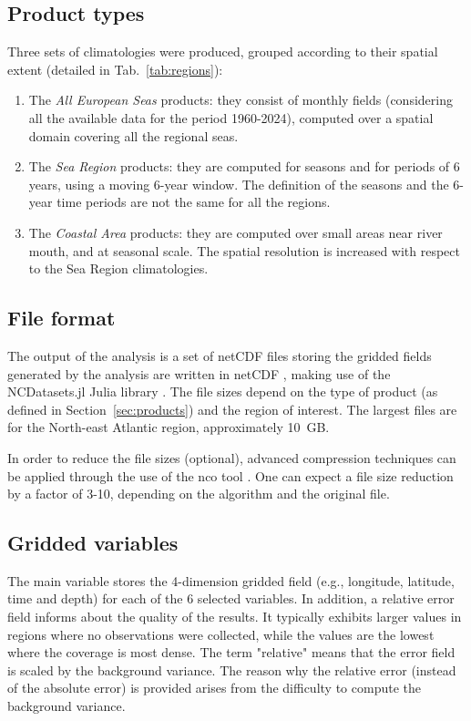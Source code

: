 \documentclass[essd, manuscript]{copernicus}
\begin{document}
\subsection{Product types\label{sec:products}}

Three sets of climatologies were produced, grouped according to their spatial extent (detailed in Tab.~\ref{tab:regions}): 
\begin{enumerate}
\item The \textit{All European Seas} products: they consist of monthly fields (considering all the available data for the period 1960-2024), computed over a spatial domain covering all the regional seas.
\item The \textit{Sea Region} products: they are computed for seasons and for periods of 6 years, using a moving 6-year window. The definition of the seasons and the 6-year time periods are not the same for all the regions. 
\item The \textit{Coastal Area} products: they are computed over small areas near river mouth, and at seasonal scale. The spatial resolution is increased with respect to the Sea Region climatologies.
\end{enumerate}

\subsection{File format}

The output of the analysis is a set of netCDF files storing the gridded fields generated by the analysis are written in netCDF \citep{Rew1990,Brown1993,Rew2006}, making use of the NCDatasets.jl Julia library \citep{Barth2024}. The file sizes depend on the type of product (as defined in Section~\ref{sec:products}) and the region of interest. The largest files are for the North-east Atlantic region, approximately 10~\unit{GB}.

In order to reduce the file sizes (optional), advanced compression techniques \citep{Silver2017,Zender2016} can be applied through the use of the nco tool \citep[netCDF operators,][]{Zender2008}. One can expect a file size reduction by a factor of 3-10, depending on the algorithm and the original file.

\subsection{Gridded variables}

The main variable stores the 4-dimension gridded field (e.g., longitude, latitude, time and depth) for each of the 6 selected variables. In addition, a relative error field informs about the quality of the results. It typically exhibits larger values in regions where no observations were collected, while the values are the lowest where the coverage is most dense. The term "relative" means that the error field is scaled by the background variance. The reason why the relative error (instead of the absolute error) is provided arises from the difficulty to compute the background variance.  
\end{document}
